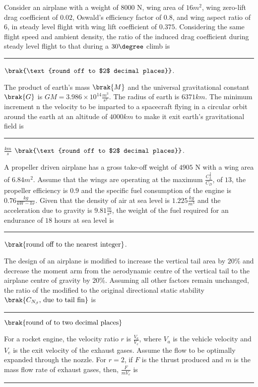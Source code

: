 \item{
Consider an airplane with a weight of $8000$ N, wing area of $16m^2$, wing zero-lift drag coefficient of $0.02$, Oswald's efficiency factor of $0.8$, and wing aspect ratio of $6$, in steady level flight with wing lift coefficient of $0.375$. Considering the same flight speed and ambient density, the ratio of the induced drag coefficient during steady level flight to that during a $30\degree$ climb is \rule{2cm}{0.15mm}$\brak{\text{round off to $2$ decimal places}}$.\\
\item{
The product of earth's mass $\brak{M}$ and the universal gravitational constant $\brak{G}$ is $GM=3.986\times10^{14}\frac{m^3}{s^2}$. The radius of earth is $6371km$. The minimum increment n the velocity to be imparted to a spacecraft flying in a circular orbit around the earth at an altitude of $4000km$ to make it exit earth's gravitational field is \rule{2cm}{0.15mm}$\frac{km}{s}$ $\brak{\text{round off to $2$ decimal places}}$.\\
}
\item{
A propeller driven airplane has a gross take-off weight of $4905$ N with a wing area of $6.84 m^2$. Assume that the wings are operating at the maximum $\frac{C_L^{\frac{3}{2}}}{C_D}$, of $13$, the propeller efficiency is $0.9$ and the specific fuel consumption of the engine is $0.76\frac{kg}{kW-hr}$. Given that the density of air at sea level is $1.225\frac{kg}{m^3}$ and the acceleration due to gravity is $9.81\frac{m}{s^2}$, the weight of the fuel required for an endurance of $18$ hours at sea level is \rule{2cm}{0.15mm}$\brak{\text{round off to the nearest integer}}$.\\
}
\item{
The design of an airplane is modified to increase the vertical tail area by $20\%$ and decrease the moment arm from the aerodynamic centre of the vertical tail to the airplane centre of gravity by $20\%$. Assuming all other factors remain unchanged, the ratio of the modified to the original directional static stability $\brak{C_{N_\beta}\text{, due to tail fin}}$ is \rule{2cm}{0.15mm}
$\brak{\text{round of to two decimal places}}$\\
}
\item{
For a rocket engine, the velocity ratio $r$ is $\frac{V_a}{V_e}$, where $V_a$ is the vehicle velocity and $V_e$ is the exit velocity of the exhaust gases. Assume the flow to be optimally expanded through the nozzle. For $r=2$, if $F$ is the thrust produced and $m$ is the mass flow rate of exhaust gases, then, $\frac{F}{mV_e}$ is \rule{2cm}{0.15mm}\\
}}
